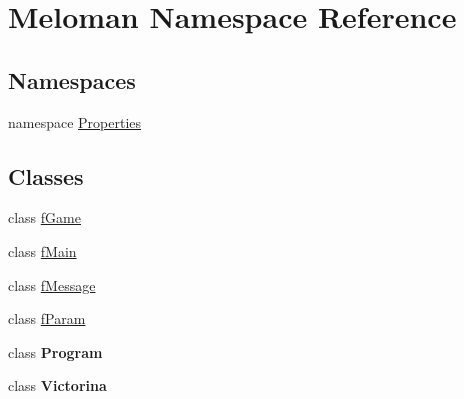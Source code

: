 \hypertarget{namespace_meloman}{}\section{Meloman Namespace Reference}
\label{namespace_meloman}
\subsection*{Namespaces}
\begin{DoxyCompactItemize}
\item 
namespace \mbox{\hyperlink{namespace_meloman_1_1_properties}{Properties}}
\end{DoxyCompactItemize}
\subsection*{Classes}
\begin{DoxyCompactItemize}
\item 
class \mbox{\hyperlink{class_meloman_1_1f_game}{f\+Game}}
\item 
class \mbox{\hyperlink{class_meloman_1_1f_main}{f\+Main}}
\item 
class \mbox{\hyperlink{class_meloman_1_1f_message}{f\+Message}}
\item 
class \mbox{\hyperlink{class_meloman_1_1f_param}{f\+Param}}
\item 
class {\bfseries Program}
\item 
class {\bfseries Victorina}
\end{DoxyCompactItemize}
